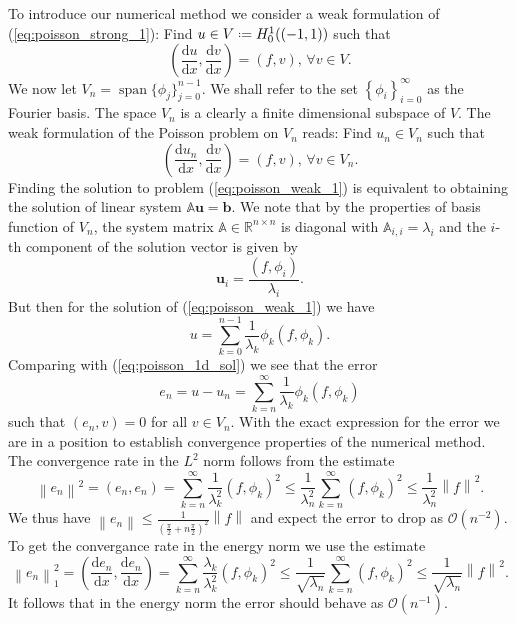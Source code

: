 \documentclass[a4paper,10pt]{article}
\newcommand{\R}{\ensuremath{\mathbb{R}}}
\newcommand{\norm}[1]{\ensuremath{\left\|#1\right\|}}
\newcommand{\inner}[2]{\ensuremath{\left(#1, #2\right)}}
\newcommand{\deriv}[2]{\ensuremath{\frac{\mathrm{d}#1}{\mathrm{d}#2}}}
\newcommand*{\defeq}{\mathrel{\vcenter{\baselineskip0.5ex \lineskiplimit0pt
                     \hbox{\scriptsize.}\hbox{\scriptsize.}}}%
                     =}
\DeclareMathOperator{\spn}{span}
\begin{document}
  To introduce our numerical method we consider a weak formulation of
  (\ref{eq:poisson_strong_1}): Find $u\in V\defeq H^1_0((-1, 1))$ such that
  \[
    \inner{\deriv{u}{x}}{\deriv{v}{x}} = \inner{f}{v},\,\forall v\in V.
  \]
  We now let $V_n=\spn\{\phi_j\}_{j=0}^{n-1}$. We shall refer to the set 
  $\left\{\phi_i\right\}_{i=0}^{\infty}$ as the Fourier basis. The space $V_n$
  is a clearly a finite dimensional subspace of $V$. The weak formulation of
  the Poisson problem on $V_n$ reads: Find $u_n\in V_n$ such that
  \begin{equation}
    \label{eq:poisson_weak_1}
    \inner{\deriv{u_n}{x}}{\deriv{v}{x}} = \inner{f}{v},\,\forall v\in V_n.
  \end{equation}
  Finding the solution to problem (\ref{eq:poisson_weak_1}) is equivalent to
  obtaining the solution of linear system $\mathbb{A}\mathbf{u}=\mathbf{b}$.
  We note that by the properties of basis function of $V_n$, the system matrix
  $\mathbb{A}\in\R^{n\times n}$ is diagonal with $\mathbb{A}_{i, i}=\lambda_i$
  and the $i$-th component of the solution vector is given by
  \[
    \mathbf{u}_i = \frac{\inner{f}{\phi_i}}{\lambda_i}.
  \]
  But then for the solution of (\ref{eq:poisson_weak_1}) we have
  \[
    u = \sum_{k=0}^{n-1} \frac{1}{\lambda_k} \phi_k (f, \phi_k).
  \]
  Comparing with (\ref{eq:poisson_1d_sol}) we see that the error
  \[
    e_n=u-u_n = \sum_{k=n}^{\infty} \frac{1}{\lambda_k} \phi_k (f, \phi_k)
  \]
  such that $(e_n, v)=0$ for all $v\in V_n$. With the exact expression for the
  error we are in a position to establish convergence properties of the
  numerical method. The convergence rate in the $L^2$ norm follows from the
  estimate
  \[
    \norm{e_n}^2=\inner{e_n}{e_n} = \sum_{k=n}^{\infty} \frac{1}{\lambda^2_k}(f, \phi_k)^2 \leq
      \frac{1}{\lambda^2_n}\sum_{k=n}^{\infty} (f, \phi_k)^2 \leq
      \frac{1}{\lambda^2_n}\norm{f}^2.
  \]
  We thus have $\norm{e_n}\leq\frac{1}{\left(\frac{\pi}{2} +
  n\frac{\pi}{2}\right)^2}\norm{f}$ and expect the error to drop as
  $\mathcal{O}(n^{-2})$. To get the convergance rate in the energy norm we use
  the estimate
  \[
    \norm{e_n}^2_1=\inner{\deriv{e_n}{x}}{\deriv{e_n}{x}} =
    \sum_{k=n}^{\infty} \frac{\lambda_k}{\lambda^2_k}(f, \phi_k)^2 \leq
    \frac{1}{\sqrt{\lambda_n}}\sum_{k=n}^{\infty} (f, \phi_k)^2 \leq
    \frac{1}{\sqrt{\lambda_n}}\norm{f}^2.
  \]
  It follows that in the energy norm the error should behave as
  $\mathcal{O}(n^{-1})$.
\end{document}
